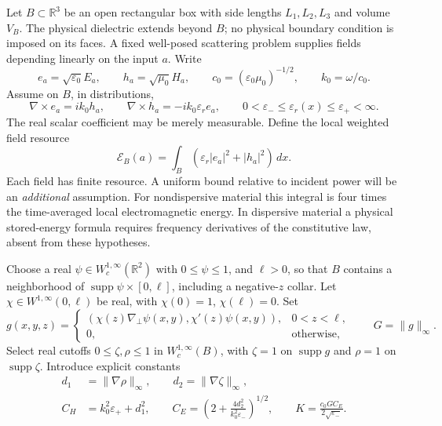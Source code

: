 Let $B\subset\mathbb R^3$ be an open rectangular box with side lengths
$L_1,L_2,L_3$ and volume $V_B$.  The physical dielectric extends beyond $B$;
no physical boundary condition is imposed on its faces.  A fixed well-posed
scattering problem supplies fields depending linearly on the input $a$.
Write
\begin{equation}
 e_a=\sqrt{\varepsilon_0}E_a,\qquad h_a=\sqrt{\mu_0}H_a,
 \qquad c_0=(\varepsilon_0\mu_0)^{-1/2},\qquad k_0=\omega/c_0.
 \label{ch:normalization}
\end{equation}
Assume on $B$, in distributions,
\begin{equation}
 \nabla\times e_a=ik_0h_a,\qquad
 \nabla\times h_a=-ik_0\varepsilon_r e_a,\qquad
 0<\varepsilon_-\leq\varepsilon_r(x)\leq\varepsilon_+<\infty.
 \label{ch:localmaxwell}
\end{equation}
The real scalar coefficient may be merely measurable.  Define the local
weighted field resource
\begin{equation}
 \mathcal E_B(a)=\int_B(\varepsilon_r|e_a|^2+|h_a|^2)\,dx.
 \label{ch:resource}
\end{equation}
Each field has finite resource.  A uniform bound relative to incident power
will be an \emph{additional} assumption.  For nondispersive material this
integral is four times the time-averaged local electromagnetic energy.
In dispersive material a physical stored-energy formula requires frequency
derivatives of the constitutive law, absent from these hypotheses.

Choose a real $\psi\in W^{1,\infty}_c(\mathbb R^2)$ with $0\leq\psi\leq1$,
and $\ell>0$, so that $B$ contains a neighborhood of
$\operatorname{supp}\psi\times[0,\ell]$, including a negative-$z$ collar.
Let $\chi\in W^{1,\infty}(0,\ell)$ be real, with
$\chi(0)=1$, $\chi(\ell)=0$.  Set
\begin{equation}
 g(x,y,z)=
 \begin{cases}
  (\chi(z)\nabla_\perp\psi(x,y),\chi'(z)\psi(x,y)),&0<z<\ell,\\
  0,&\text{otherwise},
 \end{cases}
 \qquad G=\|g\|_\infty.
 \label{ch:g}
\end{equation}
Select real cutoffs $0\leq\zeta,\rho\leq1$ in
$W^{1,\infty}_c(B)$, with $\zeta=1$ on $\operatorname{supp}g$ and
$\rho=1$ on $\operatorname{supp}\zeta$.  Introduce explicit constants
\begin{equation}
 \begin{split}
 d_1&=\|\nabla\rho\|_\infty,\qquad d_2=\|\nabla\zeta\|_\infty,\\
 C_H&=k_0^2\varepsilon_++d_1^2,\qquad
 C_E=\left(2+\frac{4d_2^2}{k_0^2\varepsilon_-}\right)^{1/2},\qquad
 K=\frac{c_0GC_E}{2\sqrt{\varepsilon_-}}.
 \end{split}
 \label{ch:constants}
\end{equation}

